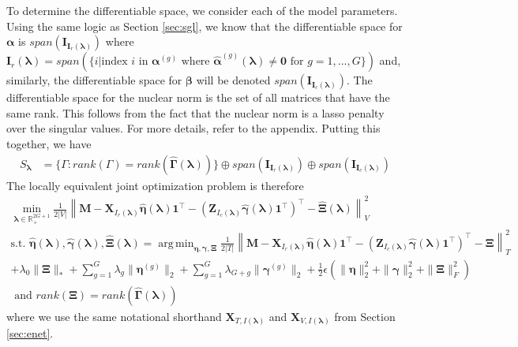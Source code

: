 \documentclass[12pt]{article}
\DeclareMathOperator*{\argmin}{arg\,min}
\begin{document}
To determine the differentiable space, we consider each of the model parameters. Using the same logic as Section \ref{sec:sgl}, we know that the differentiable space for $\boldsymbol{\alpha}$ is $span(\boldsymbol{I}_{\boldsymbol{I}_r(\boldsymbol\lambda)})$ where
$
\boldsymbol{I}_r(\boldsymbol\lambda)
= 
span(\{
i | \text{index } i \text{ in } \boldsymbol{\alpha}^{(g)} \text{ where }
\hat{\boldsymbol{\alpha}}^{(g)}(\boldsymbol{\lambda}) \ne \boldsymbol{0} \text{ for } g=1,...,G
\})
$ and, similarly, the differentiable space for $\boldsymbol{\beta}$ will be denoted $span(\boldsymbol{I}_{\boldsymbol{I}_c(\boldsymbol\lambda)})$. The differentiable space for the nuclear norm is the set of all matrices that have the same rank. This follows from the fact that the nuclear norm is a lasso penalty over the singular values. For more details, refer to the appendix. Putting this together, we have
\begin{align}
S_{\boldsymbol \lambda} 
& = 
\{
\Gamma: rank(\Gamma) = rank(\hat{\boldsymbol{\Gamma}}(\boldsymbol{\lambda}))
\}
\oplus span(\boldsymbol{I}_{\boldsymbol{I}_r(\boldsymbol\lambda)})
\oplus span(\boldsymbol{I}_{\boldsymbol{I}_c(\boldsymbol\lambda)})
\end{align}
The locally equivalent joint optimization problem is therefore
\begin{equation}
\begin{array}{c}
\min_{\boldsymbol{\lambda} \in \mathbb{R}^{2G+1}_{+}} \frac{1}{2|V|}
\left \| 
\boldsymbol{M} 
- \boldsymbol{X}_{I_r(\boldsymbol{\lambda})} \hat{\boldsymbol{\eta}}(\boldsymbol{\lambda})  \boldsymbol{1}^\top 
- (\boldsymbol{Z}_{I_c(\boldsymbol{\lambda})} \hat{\boldsymbol{\gamma}}(\boldsymbol{\lambda})  \boldsymbol{1}^\top )^\top
- \hat{\boldsymbol{\Xi}}(\boldsymbol{\lambda})
\right \|^2_V \\
\text{s.t. }
\hat{\boldsymbol{\eta}}(\boldsymbol{\lambda}),
\hat{\boldsymbol{\gamma}}(\boldsymbol{\lambda}),
\hat{\boldsymbol{\Xi}}(\boldsymbol{\lambda})
=
\argmin_{
	\boldsymbol{\eta}, \boldsymbol{\gamma}, \boldsymbol{\Xi}
} 
\frac{1}{2|T|} 
\left \| 
\boldsymbol{M} 
- \boldsymbol{X}_{I_r(\boldsymbol{\lambda})} \hat{\boldsymbol{\eta}}(\boldsymbol{\lambda})  \boldsymbol{1}^\top 
- (\boldsymbol{Z}_{I_c(\boldsymbol{\lambda})} \hat{\boldsymbol{\gamma}}(\boldsymbol{\lambda})  \boldsymbol{1}^\top )^\top
- \boldsymbol{\Xi}
\right \|^2_T \\
+ \lambda_0 \| \boldsymbol\Xi \|_*
+ \sum_{g=1}^G  \lambda_g \| \boldsymbol\eta^{(g)} \|_2
+ \sum_{g=1}^G  \lambda_{G+g} \| \boldsymbol\gamma^{(g)} \|_2
+ \frac{1}{2} \epsilon \left (
\| \boldsymbol\eta \|_2^2 + \| \boldsymbol\gamma \|_2^2 + \| \boldsymbol{\Xi}\|^2_F
\right )\\
\text{ and } rank(\boldsymbol{\Xi}) = rank(\hat{\boldsymbol{\Gamma}}(\boldsymbol{\lambda}))
\end{array}
\label{eq:matrix_comp_groups_smooth}
\end{equation}
where we use the same notational shorthand $\boldsymbol{X}_{T, I(\boldsymbol\lambda)}$ and $\boldsymbol{X}_{V, I(\boldsymbol\lambda)}$ from Section \ref{sec:enet}.
\end{document}
